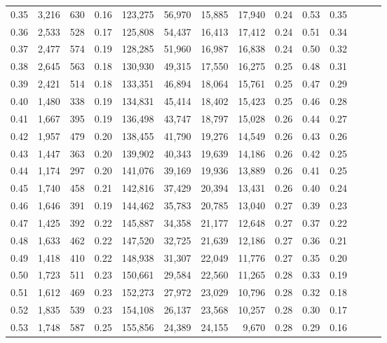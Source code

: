 \begin{tabular}{rrrrrrrrrrrrrr}
0.35 &  3,216 &  630 &  0.16 &  123,275 &   56,970 &  15,885 &  17,940 &  0.24 &  0.53 &      0.35 \\
0.36 &  2,533 &  528 &  0.17 &  125,808 &   54,437 &  16,413 &  17,412 &  0.24 &  0.51 &      0.34 \\
0.37 &  2,477 &  574 &  0.19 &  128,285 &   51,960 &  16,987 &  16,838 &  0.24 &  0.50 &      0.32 \\
0.38 &  2,645 &  563 &  0.18 &  130,930 &   49,315 &  17,550 &  16,275 &  0.25 &  0.48 &      0.31 \\
0.39 &  2,421 &  514 &  0.18 &  133,351 &   46,894 &  18,064 &  15,761 &  0.25 &  0.47 &      0.29 \\
0.40 &  1,480 &  338 &  0.19 &  134,831 &   45,414 &  18,402 &  15,423 &  0.25 &  0.46 &      0.28 \\
0.41 &  1,667 &  395 &  0.19 &  136,498 &   43,747 &  18,797 &  15,028 &  0.26 &  0.44 &      0.27 \\
0.42 &  1,957 &  479 &  0.20 &  138,455 &   41,790 &  19,276 &  14,549 &  0.26 &  0.43 &      0.26 \\
0.43 &  1,447 &  363 &  0.20 &  139,902 &   40,343 &  19,639 &  14,186 &  0.26 &  0.42 &      0.25 \\
0.44 &  1,174 &  297 &  0.20 &  141,076 &   39,169 &  19,936 &  13,889 &  0.26 &  0.41 &      0.25 \\
0.45 &  1,740 &  458 &  0.21 &  142,816 &   37,429 &  20,394 &  13,431 &  0.26 &  0.40 &      0.24 \\
0.46 &  1,646 &  391 &  0.19 &  144,462 &   35,783 &  20,785 &  13,040 &  0.27 &  0.39 &      0.23 \\
0.47 &  1,425 &  392 &  0.22 &  145,887 &   34,358 &  21,177 &  12,648 &  0.27 &  0.37 &      0.22 \\
0.48 &  1,633 &  462 &  0.22 &  147,520 &   32,725 &  21,639 &  12,186 &  0.27 &  0.36 &      0.21 \\
0.49 &  1,418 &  410 &  0.22 &  148,938 &   31,307 &  22,049 &  11,776 &  0.27 &  0.35 &      0.20 \\
0.50 &  1,723 &  511 &  0.23 &  150,661 &   29,584 &  22,560 &  11,265 &  0.28 &  0.33 &      0.19 \\
0.51 &  1,612 &  469 &  0.23 &  152,273 &   27,972 &  23,029 &  10,796 &  0.28 &  0.32 &      0.18 \\
0.52 &  1,835 &  539 &  0.23 &  154,108 &   26,137 &  23,568 &  10,257 &  0.28 &  0.30 &      0.17 \\
0.53 &  1,748 &  587 &  0.25 &  155,856 &   24,389 &  24,155 &   9,670 &  0.28 &  0.29 &      0.16 \\

\end{tabular}

